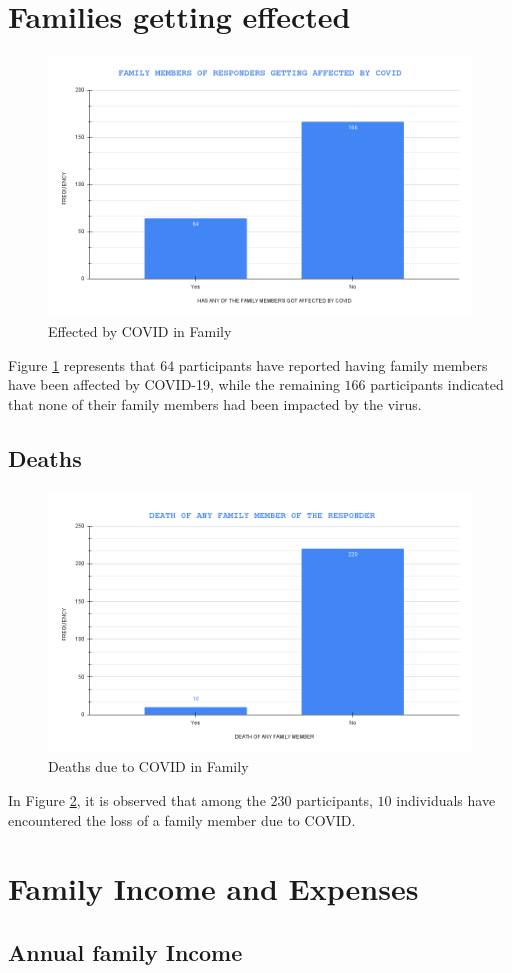 \section{Families getting effected}

\begin{figure}[h!]
	\centering
	\includegraphics[width=0.5\linewidth]{IMAGES/Image 26.png}
	\caption{Effected by COVID in Family}
	\label{G26}
\end{figure}

Figure \ref{G26} represents that $64$ participants have reported having family members have been affected by COVID-19, while the remaining $166$ participants indicated that none of their family members had been impacted by the virus.


\subsection{Deaths}
\begin{figure}[h!]
	\centering
	\includegraphics[width=0.5\linewidth]{IMAGES/Image 27.png}
	\caption{Deaths due to COVID in Family}
	\label{G27}
\end{figure}

In Figure \ref{G27}, it is observed that among the $230$ participants, $10$ individuals have encountered the loss of a family member due to COVID.

\newpage

\section{Family Income and Expenses}

\subsection{Annual family Income}

